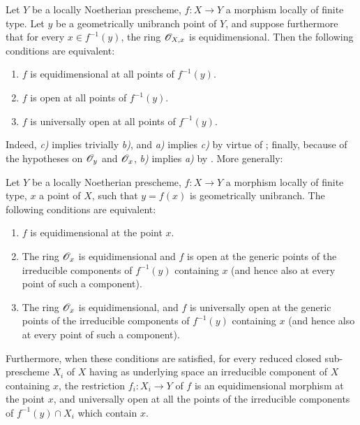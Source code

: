 \begin{corollary}[14.4.6]
\label{IV.14.4.6}
Let $Y$ be a locally Noetherian prescheme, $f:X\to Y$ a morphism locally of finite type.
Let $y$ be a geometrically unibranch point of $Y$, and suppose furthermore that for every $x\in f^{-1}(y)$, the ring $\mathscr{O}_{X,x}$ is equidimensional.
Then the following conditions are equivalent:
\begin{enumerate}[label=\emph{\alph*)}]
  \item $f$ is equidimensional  at all points of $f^{-1}(y)$.
  \item $f$ is open at all points of $f^{-1}(y)$.
  \item $f$ is universally open at all points of $f^{-1}(y)$.
\end{enumerate}
\end{corollary}

Indeed, \emph{c)} implies trivially \emph{b)}, and \emph{a)} implies \emph{c)} by virtue of ; finally, because of the hypotheses on $\mathscr{O}_y$ and $\mathscr{O}_x$, \emph{b)} implies \emph{a)} by .
More generally:

\begin{proposition}[14.4.7]
\label{IV.14.4.7}
Let $Y$ be a locally Noetherian prescheme, $f:X\to Y$ a morphism locally of finite type, $x$ a point of $X$, such that $y=f(x)$ is geometrically unibranch.
The following conditions are equivalent:
\begin{enumerate}[label=\emph{\alph*)}]
  \item $f$ is equidimensional  at the point $x$.
  \item The ring $\mathscr{O}_x$ is equidimensional and $f$ is open at the generic points of the irreducible components of $f^{-1}(y)$ containing $x$ (and hence also at every point of such a component).
  \item The ring $\mathscr{O}_x$ is equidimensional, and $f$ is universally open at the generic points of the irreducible components of $f^{-1}(y)$ containing $x$ (and hence also at every point of such a component).
\end{enumerate}
Furthermore, when these conditions are satisfied, for every reduced closed sub-prescheme $X_i$ of $X$ having as underlying space an irreducible component of $X$ containing $x$, the restriction $f_i:X_i\to Y$ of $f$ is an equidimensional morphism at the point $x$, and universally open at all the points of the irreducible components of $f^{-1}(y)\cap X_i$ which contain $x$.
\end{proposition}

